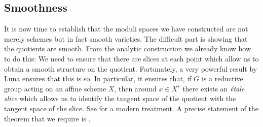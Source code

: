 \documentclass[12pt]{ociamthesis}  %
\begin{document}
\subsection{Smoothness}

It is now time to establish that the moduli spaces we have constructed
are not merely schemes but in fact smooth varieties. The difficult
part is showing that the quotients are smooth. From the analytic
construction we already know how to do this: We need to ensure that
there are slices at each point which allow us to obtain a smooth
structure on the quotient. Fortunately, a very powerful result by
Luna \cite[97]{luna1973} ensures that this is so. In particular, it
ensures that, if $G$ is a reductive group acting on an affine scheme
$X$, then around $x\in X^s$ there exists an \emph{\'etale slice}
which allows us to identify the tangent space of the quotient with
the tangent space of the slice. See \cite{drezet2004} for a modern
treatment. A precise statement of the theorem that we require is
\cite[Theorem 4.2.12]{huybrechts2010}.
\end{document}
